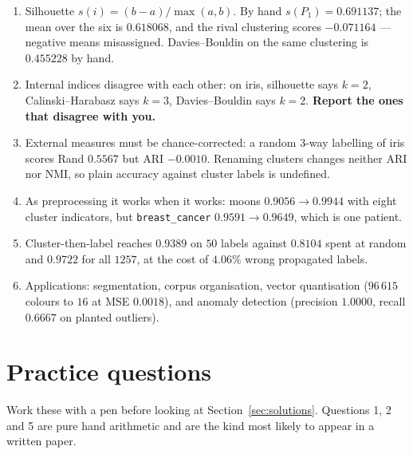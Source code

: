 \documentclass[11pt]{article}
\begin{document}
\begin{enumerate}[leftmargin=*]
    $75/4 = \mathbf{18.75}$ by hand, $18.7500$ from scikit-learn.
  \item Silhouette $s(i) = (b - a)/\max(a,b)$. By hand $s(P_1) =
    \mathbf{0.691137}$; the mean over the six is $0.618068$, and the rival
    clustering scores $\mathbf{-0.071164}$ --- negative means misassigned.
    Davies--Bouldin on the same clustering is $0.455228$ by hand.
  \item Internal indices disagree with each other: on iris, silhouette says
    $k=2$, Calinski--Harabasz says $k=3$, Davies--Bouldin says $k=2$.
    \textbf{Report the ones that disagree with you.}
  \item External measures must be chance-corrected: a random 3-way labelling
    of iris scores Rand $\mathbf{0.5567}$ but ARI $\mathbf{-0.0010}$.
    Renaming clusters changes neither ARI nor NMI, so plain accuracy
    against cluster labels is undefined.
  \item As preprocessing it works when it works: moons
    $0.9056 \to \mathbf{0.9944}$ with eight cluster indicators, but
    \texttt{breast\_cancer} $0.9591 \to 0.9649$, which is one patient.
  \item Cluster-then-label reaches $\mathbf{0.9389}$ on $50$ labels against
    $0.8104$ spent at random and $0.9722$ for all $1257$, at the cost of
    $4.06\%$ wrong propagated labels.
  \item Applications: segmentation, corpus organisation, vector quantisation
    ($96\,615$ colours to $16$ at MSE $0.0018$), and anomaly detection
    (precision $1.0000$, recall $0.6667$ on planted outliers).
\end{enumerate}

\section{Practice questions}
\label{sec:practice}

Work these with a pen before looking at Section~\ref{sec:solutions}.
Questions 1, 2 and 5 are pure hand arithmetic and are the kind most likely to
appear in a written paper.
\end{document}
